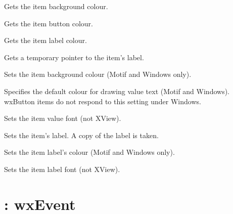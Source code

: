 Gets the item background colour.



Gets the item button colour.



Gets the item label colour.



Gets a temporary pointer to the item's label.



Sets the item background colour (Motif and Windows only).



Specifies the default colour for drawing value text (Motif and Windows).
wxButton items do not respond to this setting under Windows.



Sets the item value font (not XView).



Sets the item's label. A copy of the label is taken.



Sets the item label's colour (Motif and Windows only).



Sets the item label font (not XView).

\section{: wxEvent}\label{wxkeyevent}

